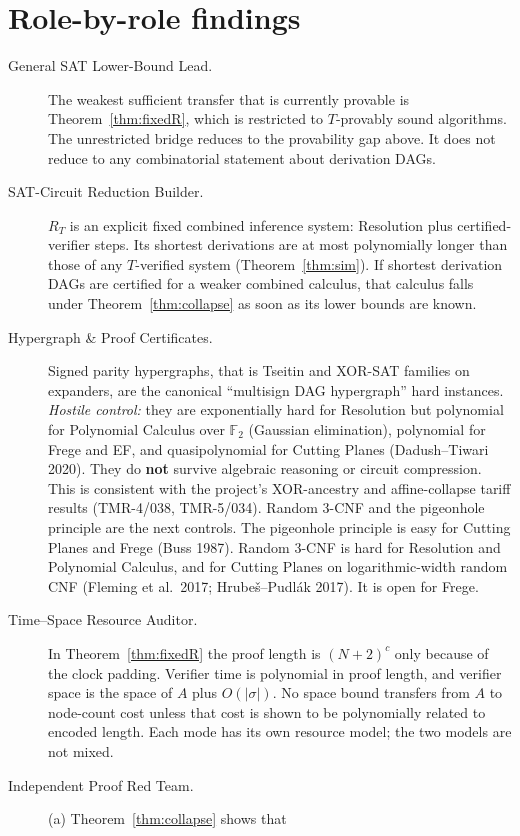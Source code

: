 \documentclass[11pt]{article}
\begin{document}
\section{Role-by-role findings}
\begin{description}
\item[General SAT Lower-Bound Lead.] The weakest sufficient transfer that is
  currently provable is Theorem~\ref{thm:fixedR}, which is restricted to
  $T$-provably sound algorithms. The unrestricted bridge reduces to the
  provability gap above. It does not reduce to any combinatorial statement
  about derivation DAGs.
\item[SAT-Circuit Reduction Builder.] $R_T$ is an explicit fixed combined
  inference system: Resolution plus certified-verifier steps. Its shortest
  derivations are at most polynomially longer than those of any $T$-verified
  system (Theorem~\ref{thm:sim}). If shortest derivation DAGs are certified for
  a weaker combined calculus, that calculus falls under
  Theorem~\ref{thm:collapse} as soon as its lower bounds are known.
\item[Hypergraph \& Proof Certificates.] Signed parity hypergraphs, that is
  Tseitin and XOR-SAT families on expanders, are the canonical
  ``multisign DAG hypergraph'' hard instances. \emph{Hostile control:} they are
  exponentially hard for Resolution but polynomial for Polynomial Calculus over
  $\mathbb F_2$ (Gaussian elimination), polynomial for Frege and EF, and
  quasipolynomial for Cutting Planes (Dadush--Tiwari 2020). They do
  \textbf{not} survive algebraic reasoning or circuit compression. This is
  consistent with the project's XOR-ancestry and affine-collapse tariff results
  (TMR-4/038, TMR-5/034). Random 3-CNF and the pigeonhole principle are the
  next controls. The pigeonhole principle is easy for Cutting Planes and Frege
  (Buss 1987). Random 3-CNF is hard for Resolution and Polynomial Calculus, and
  for Cutting Planes on logarithmic-width random CNF (Fleming et al.\ 2017;
  Hrubeš--Pudlák 2017). It is open for Frege.
\item[Time--Space Resource Auditor.] In Theorem~\ref{thm:fixedR} the proof
  length is $(N+2)^c$ only because of the clock padding. Verifier time is
  polynomial in proof length, and verifier space is the space of $A$ plus
  $O(|\sigma|)$. No space bound transfers from $A$ to node-count cost unless
  that cost is shown to be polynomially related to encoded length. Each mode
  has its own resource model; the two models are not mixed.
\item[Independent Proof Red Team.] (a) Theorem~\ref{thm:collapse} shows that

\end{description}
\end{document}
